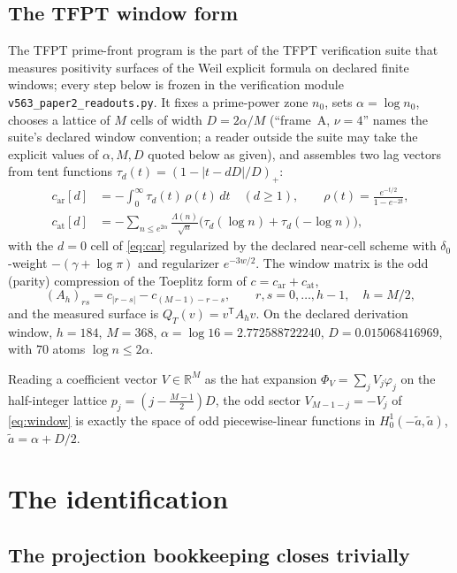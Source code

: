 \documentclass[11pt,a4paper]{article}
\theoremstyle{remark}
\newcommand{\Lam}{\Lambda}
\begin{document}
\subsection{The TFPT window form}
The TFPT prime-front program is the part of the TFPT verification
suite that measures positivity surfaces of the Weil explicit formula
on declared finite windows; every step below is frozen in the
verification module \texttt{v563\_paper2\_readouts.py}.  It fixes a
prime-power zone $n_0$, sets $\alpha=\log n_0$, chooses a lattice of
$M$ cells of width $D=2\alpha/M$ (``frame~A, $\nu=4$'' names the
suite's declared window convention; a reader outside the suite may
take the explicit values of $\alpha,M,D$ quoted below as given), and
assembles two lag vectors from tent functions
$\tau_d(t)=(1-|t-dD|/D)_+$:
\begin{align}
c_{\mathrm{ar}}[d]&=-\int_0^\infty \tau_d(t)\,\rho(t)\,dt
\quad(d\ge1),\qquad
\rho(t)=\frac{e^{-t/2}}{1-e^{-2t}},\label{eq:car}\\
c_{\mathrm{at}}[d]&=-\sum_{n\le e^{2\alpha}}\frac{\Lam(n)}{\sqrt n}
\bigl(\tau_d(\log n)+\tau_d(-\log n)\bigr),\label{eq:cat}
\end{align}
with the $d=0$ cell of \eqref{eq:car} regularized by the declared
near-cell scheme with $\delta_0$-weight $-(\gamma+\log\pi)$ and
regularizer $e^{-3w/2}$.  The window matrix is the odd (parity)
compression of the Toeplitz form of $c=c_{\mathrm{ar}}+c_{\mathrm{at}}$,
\begin{equation}\label{eq:window}
(A_h)_{rs}=c_{|r-s|}-c_{(M-1)-r-s},\qquad r,s=0,\dots,h-1,\quad h=M/2,
\end{equation}
and the measured surface is $Q_T(v)=v^{\mathsf T}A_hv$.  On the
declared derivation window, $h=184$, $M=368$,
$\alpha=\log 16=2.772588722240$, $D=0.015068416969$, with $70$ atoms
$\log n\le2\alpha$.

Reading a coefficient vector $V\in\mathbb R^M$ as the hat expansion
$\Phi_V=\sum_j V_j\varphi_j$ on the half-integer lattice
$p_j=(j-\tfrac{M-1}2)D$, the odd sector $V_{M-1-j}=-V_j$ of
\eqref{eq:window} is exactly the space of odd piecewise-linear
functions in $H^1_0(-\tilde a,\tilde a)$, $\tilde a=\alpha+D/2$.

\section{The identification}

\subsection{The projection bookkeeping closes trivially}
\end{document}
